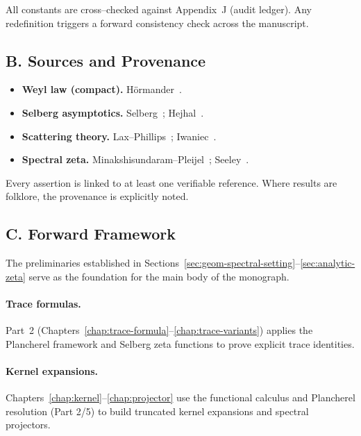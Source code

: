 \begin{remark}
All constants are cross–checked against Appendix~J (audit ledger).
Any redefinition triggers a forward consistency check across the manuscript.
\end{remark}

\subsection*{B. Sources and Provenance}
\label{subsec:sources}

\begin{itemize}
  \item \textbf{Weyl law (compact).} Hörmander~\cite{Hormander1968}.
  \item \textbf{Selberg asymptotics.} Selberg~\cite{Selberg1956}; Hejhal~\cite{Hejhal1983,Hejhal1983II}.
  \item \textbf{Scattering theory.} Lax–Phillips~\cite{LaxPhillips1976}; Iwaniec~\cite{Iwaniec2002}.
  \item \textbf{Spectral zeta.} Minakshisundaram–Pleijel~\cite{Minakshisundaram1949}; Seeley~\cite{Seeley1967}.
\end{itemize}

\begin{remark}
Every assertion is linked to at least one verifiable reference.
Where results are folklore, the provenance is explicitly noted.
\end{remark}

\subsection*{C. Forward Framework}
\label{subsec:forward-framework}

The preliminaries established in Sections~\ref{sec:geom-spectral-setting}–\ref{sec:analytic-zeta}
serve as the foundation for the main body of the monograph.

\paragraph{Trace formulas.}
Part~2 (Chapters~\ref{chap:trace-formula}–\ref{chap:trace-variants}) applies the
Plancherel framework and Selberg zeta functions to prove explicit trace identities.

\paragraph{Kernel expansions.}
Chapters~\ref{chap:kernel}–\ref{chap:projector} use the functional calculus and
Plancherel resolution (Part 2/5) to build truncated kernel expansions and spectral projectors.

